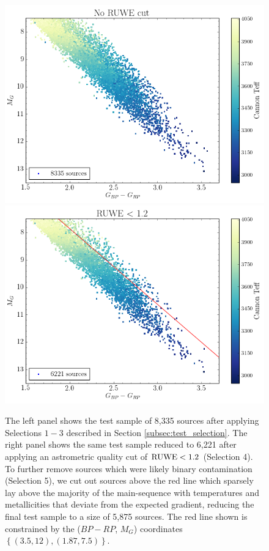 \documentclass[twocolumn]{aastex62}
\begin{document}
\begin{figure}
\begin{center}
	\includegraphics[width=\linewidth]{ruwe_cut_before.png} \\
	\includegraphics[width=\linewidth]{ruwe_cut_after.png}
	\caption{The left panel shows the test sample of 8,335 sources after applying Selections $1-3$ described in Section \ref{subsec:test_selection}. The right panel shows the same test sample reduced to 6,221 after applying an astrometric quality cut of ${\rm RUWE}<1.2$ (Selection 4). To further remove sources which were likely binary contamination (Selection 5), we cut out sources above the red line which sparsely lay above the majority of the main-sequence with temperatures and metallicities that deviate from the expected gradient, reducing the final test sample to a size of 5,875 sources. The red line shown is constrained by the ($BP-RP$, $M_G$) coordinates $\left\{ (3.5,12), (1.87,7.5) \right\}$.}
	\label{fig:ruwe_cut}
\end{center}
\end{figure}
\end{document}
